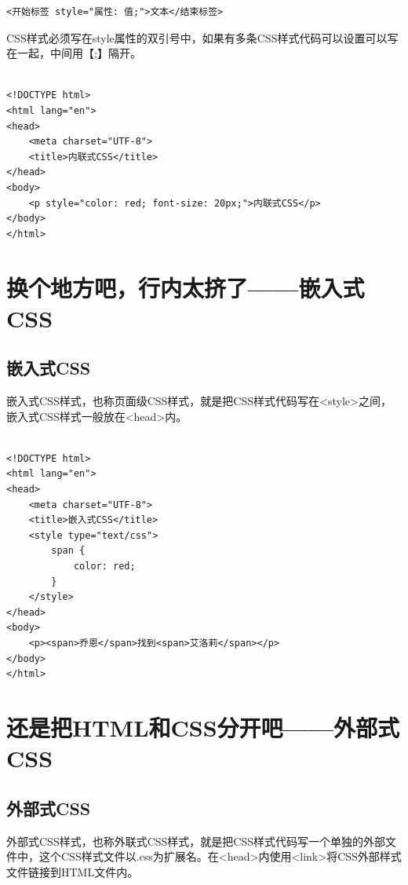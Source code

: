 \begin{lstlisting}[style=htmlcssjs]
<开始标签 style="属性: 值;">文本</结束标签>
\end{lstlisting}

CSS样式必须写在style属性的双引号中，如果有多条CSS样式代码可以设置可以写在一起，中间用【;】隔开。 \\

 \\
\begin{lstlisting}[style=htmlcssjs]
<!DOCTYPE html>
<html lang="en">
<head>
    <meta charset="UTF-8">
    <title>内联式CSS</title>
</head>
<body>
    <p style="color: red; font-size: 20px;">内联式CSS</p>
</body>
</html>
\end{lstlisting}

\newpage

\section{换个地方吧，行内太挤了——嵌入式CSS}

\subsection{嵌入式CSS}

嵌入式CSS样式，也称页面级CSS样式，就是把CSS样式代码写在<style>之间，嵌入式CSS样式一般放在<head>内。 \\

 \\
\begin{lstlisting}[style=htmlcssjs]
<!DOCTYPE html>
<html lang="en">
<head>
    <meta charset="UTF-8">
    <title>嵌入式CSS</title>
    <style type="text/css">
        span {
            color: red;
        }
    </style>
</head>
<body>
    <p><span>乔恩</span>找到<span>艾洛莉</span></p>
</body>
</html>
\end{lstlisting}

\newpage

\section{还是把HTML和CSS分开吧——外部式CSS}

\subsection{外部式CSS}

外部式CSS样式，也称外联式CSS样式，就是把CSS样式代码写一个单独的外部文件中，这个CSS样式文件以.css为扩展名。在<head>内使用<link>将CSS外部样式文件链接到HTML文件内。 \\

